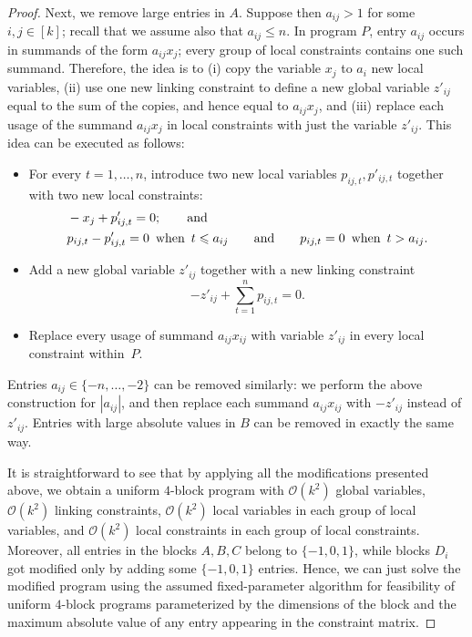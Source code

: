 \documentclass{theoretics}
\renewcommand{\leq}{\leqslant}
\newcommand{\Oh}{{\mathcal{O}}}
\begin{document}
\begin{proof}
    Next, we remove large entries in $A$. Suppose then $a_{ij}>1$ for some $i,j\in [k]$; recall that we assume also that $a_{ij}\leq n$. In program $P$, entry $a_{ij}$ occurs in summands of the form $a_{ij}x_j$; every group of local constraints contains one such summand. Therefore, the idea is to (i) copy the variable $x_j$ to $a_i$ new local variables, (ii) use one new linking constraint to define a new global variable $z'_{ij}$ equal to the sum of the copies, and hence equal to $a_{ij}x_j$, and (iii) replace each usage of the summand $a_{ij}x_j$ in local constraints with just the variable $z'_{ij}$. This idea can be executed as follows:
    \begin{itemize}[nosep]
        \item[(i)] For every $t=1,\ldots,n$, introduce two new local variables $p_{ij,t},p'_{ij,t}$ together with two new local constraints:
        \begin{align*}
         & -x_j+p'_{ij,t}=0;\qquad \textrm{and}\\
         & p_{ij,t}-p'_{ij,t}=0\textrm{\, when \,}t\leq a_{ij}\qquad \textrm{and}\qquad p_{ij,t}=0 \textrm{\, when \,} t>a_{ij}.
        \end{align*}
        \item[(ii)] Add a new global variable $z'_{ij}$ together with a new linking constraint $$-z'_{ij}+\sum_{t=1}^n p_{ij,t}=0.$$
        \item[(iii)] Replace every usage of summand $a_{ij}x_{ij}$ with variable $z'_{ij}$ in every local constraint within~$P$.
    \end{itemize}

    Entries $a_{ij}\in \{-n,\ldots,-2\}$ can be removed similarly: we perform the above construction for $|a_{ij}|$, and then replace each summand $a_{ij}x_{ij}$ with $-z'_{ij}$ instead of $z'_{ij}$. Entries with large absolute values in $B$ can be removed in exactly the same way.

    It is straightforward to see that by applying all the modifications presented above, we obtain a uniform $4$-block program with $\Oh(k^2)$ global variables, $\Oh(k^2)$ linking constraints, $\Oh(k^2)$ local variables in each group of local variables, and $\Oh(k^2)$ local constraints in each group of local constraints. Moreover, all entries in the blocks $A,B,C$ belong to $\{-1,0,1\}$, while blocks $D_i$ got modified only by adding some $\{-1,0,1\}$ entries. Hence, we can just solve the modified program using the assumed fixed-parameter algorithm for feasibility of uniform $4$-block programs parameterized by the dimensions of the block and the maximum absolute value of any entry appearing in the constraint matrix.
\end{proof}
\end{document}
